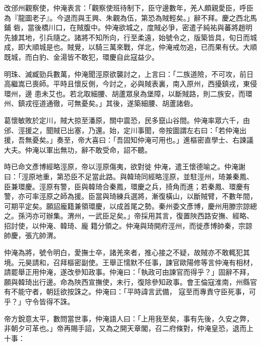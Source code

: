 \begin{pinyinscope}
 改邠州觀察使，仲淹表言：「觀察使班待制下，臣守邊數年，羌人頗親愛臣，呼臣為『龍圖老子』。今退而與王興、朱觀為伍，第恐為賊輕矣。」辭不拜。慶之西北馬鋪
 砦，當後橋川口，在賊腹中。仲淹欲城之，度賊必爭，密遣子純祐與蕃將趙明先據其地，引兵隨之。諸將不知所向，行至柔遠，始號令之，版築皆具，旬日而城成，即大順城是也。賊覺，以騎三萬來戰，佯北，仲淹戒勿追，已而果有伏。大順既城，而白豹、金湯皆不敢犯，環慶自此寇益少。



 明珠、滅臧勁兵數萬，仲淹聞涇原欲襲討之，上言曰：「二族道險，不可攻，前日高繼嵩已喪師。平時且懷反側，今討之，必與賊表裏，南入原州，西擾鎮戎，東侵環州，邊
 患未艾也。若北取細腰、胡蘆眾泉為堡障，以斷賊路，則二族安，而環州、鎮戎徑道通徹，可無憂矣。」其後，遂築細腰、胡蘆諸砦。



 葛懷敏敗於定川，賊大掠至潘原，關中震恐，民多竄山谷間。仲淹率眾六千，由邠、涇援之，聞賊已出塞，乃還。始，定川事聞，帝按圖謂左右曰：「若仲淹出援，吾無憂矣。」奏至，帝大喜曰：「吾固知仲淹可用也。」進樞密直學士、右諫議大夫。仲淹以軍出無功，辭不敢受命，詔不聽。



 時已命文彥博經略涇原，帝以涇原傷夷，欲對徙
 仲淹，遣王懷德喻之。仲淹謝曰：「涇原地重，第恐臣不足當此路。與韓琦同經略涇原，並駐涇州，琦兼秦鳳、臣兼環慶。涇原有警，臣與韓琦合秦鳳，環慶之兵，掎角而進；若秦鳳、環慶有警，亦可率涇原之師為援。臣當與琦練兵選將，漸復橫山，以斷賊臂，不數年間，可期平定矣。願詔龐籍兼領環慶，以成首尾之勢。秦州委文彥博，慶州用滕宗諒總之。孫沔亦可辦集。渭州，一武臣足矣。」帝採用其言，復置陜西路安撫、經略、招討使，以仲淹、韓琦、龐
 籍分領之。仲淹與琦開府涇州，而徙彥博帥秦，宗諒帥慶，張亢帥渭。



 仲淹為將，號令明白，愛撫士卒，諸羌來者，推心接之不疑，故賊亦不敢輒犯其境。元昊請和，召拜樞密副使。王舉正懦默不任事，諫官歐陽修等言仲淹有相材，請罷舉正用仲淹，遂改參知政事。仲淹曰：「執政可由諫官而得乎？」固辭不拜，願與韓琦出行邊。命為陜西宣撫使，未行，復除參知政事。會王倫寇淮南，州縣官有不能守者，朝廷欲按誅之。仲淹曰：「平時諱言武備，
 寇至而專責守臣死事，可乎？」守令皆得不誅。



 帝方銳意太平，數問當世事，仲淹語人曰：「上用我至矣，事有先後，久安之弊，非朝夕可革也。」帝再賜手詔，又為之開天章閣，召二府條對，仲淹皇恐，退而上十事：




\end{pinyinscope}
